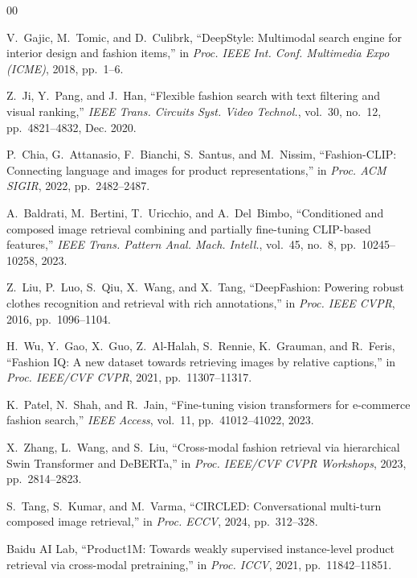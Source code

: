 \documentclass[conference]{IEEEtran}
\begin{document}
\begin{thebibliography}{00}

V.~Gajic, M.~Tomic, and D.~Culibrk, ``DeepStyle: Multimodal search engine for interior design and fashion items,'' in \emph{Proc. IEEE Int. Conf. Multimedia Expo (ICME)}, 2018, pp.~1--6.

Z.~Ji, Y.~Pang, and J.~Han, ``Flexible fashion search with text filtering and visual ranking,'' \emph{IEEE Trans. Circuits Syst. Video Technol.}, vol.~30, no.~12, pp.~4821--4832, Dec. 2020.

P.~Chia, G.~Attanasio, F.~Bianchi, S.~Santus, and M.~Nissim, ``Fashion-CLIP: Connecting language and images for product representations,'' in \emph{Proc. ACM SIGIR}, 2022, pp.~2482--2487.

A.~Baldrati, M.~Bertini, T.~Uricchio, and A.~Del~Bimbo, ``Conditioned and composed image retrieval combining and partially fine-tuning CLIP-based features,'' \emph{IEEE Trans. Pattern Anal. Mach. Intell.}, vol.~45, no.~8, pp.~10245--10258, 2023.

Z.~Liu, P.~Luo, S.~Qiu, X.~Wang, and X.~Tang, ``DeepFashion: Powering robust clothes recognition and retrieval with rich annotations,'' in \emph{Proc. IEEE CVPR}, 2016, pp.~1096--1104.

H.~Wu, Y.~Gao, X.~Guo, Z.~Al-Halah, S.~Rennie, K.~Grauman, and R.~Feris, ``Fashion IQ: A new dataset towards retrieving images by relative captions,'' in \emph{Proc. IEEE/CVF CVPR}, 2021, pp.~11307--11317.

K.~Patel, N.~Shah, and R.~Jain, ``Fine-tuning vision transformers for e-commerce fashion search,'' \emph{IEEE Access}, vol.~11, pp.~41012--41022, 2023.

X.~Zhang, L.~Wang, and S.~Liu, ``Cross-modal fashion retrieval via hierarchical Swin Transformer and DeBERTa,'' in \emph{Proc. IEEE/CVF CVPR Workshops}, 2023, pp.~2814--2823.

S.~Tang, S.~Kumar, and M.~Varma, ``CIRCLED: Conversational multi-turn composed image retrieval,'' in \emph{Proc. ECCV}, 2024, pp.~312--328.

Baidu AI Lab, ``Product1M: Towards weakly supervised instance-level product retrieval via cross-modal pretraining,'' in \emph{Proc. ICCV}, 2021, pp.~11842--11851.


\end{thebibliography}
\end{document}
